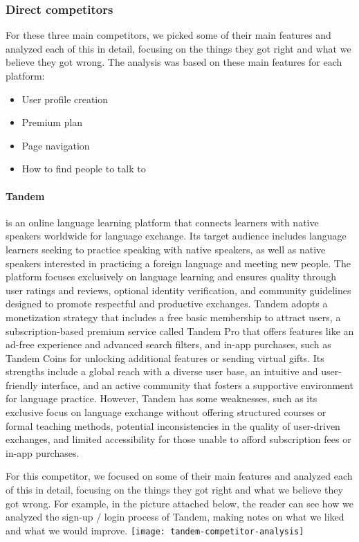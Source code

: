 \subsubsection{Direct competitors}

For these three main competitors, we picked some of their main features and analyzed each of this in detail, focusing on the things they got right and what we believe they got wrong.
The analysis was based on these main features for each platform:
\begin{itemize}
    \item User profile creation
    \item Premium plan
    \item Page navigation
    \item How to find people to talk to
\end{itemize}

\paragraph{Tandem} is an online language learning platform that connects learners with native speakers worldwide for language exchange.
Its target audience includes language learners seeking to practice speaking with native speakers, as well as native speakers interested in practicing a foreign language and meeting new people.
The platform focuses exclusively on language learning and ensures quality through user ratings and reviews, optional identity verification, and community guidelines designed to promote respectful and productive exchanges.
Tandem adopts a monetization strategy that includes a free basic membership to attract users, a subscription-based premium service called Tandem Pro that offers features like an ad-free experience and advanced search filters, and in-app purchases, such as Tandem Coins for unlocking additional features or sending virtual gifts.
Its strengths include a global reach with a diverse user base, an intuitive and user-friendly interface, and an active community that fosters a supportive environment for language practice.
However, Tandem has some weaknesses, such as its exclusive focus on language exchange without offering structured courses or formal teaching methods, potential inconsistencies in the quality of user-driven exchanges, and limited accessibility for those unable to afford subscription fees or in-app purchases.

For this competitor, we focused on some of their main features and analyzed each of this in detail, focusing on the things they got right and what we believe they got wrong.
For example, in the picture attached below, the reader can see how we analyzed the sign-up / login process of Tandem, making notes on what we liked and what we would improve.
\newline\newline
\texttt{[image: tandem-competitor-analysis]}\newline

